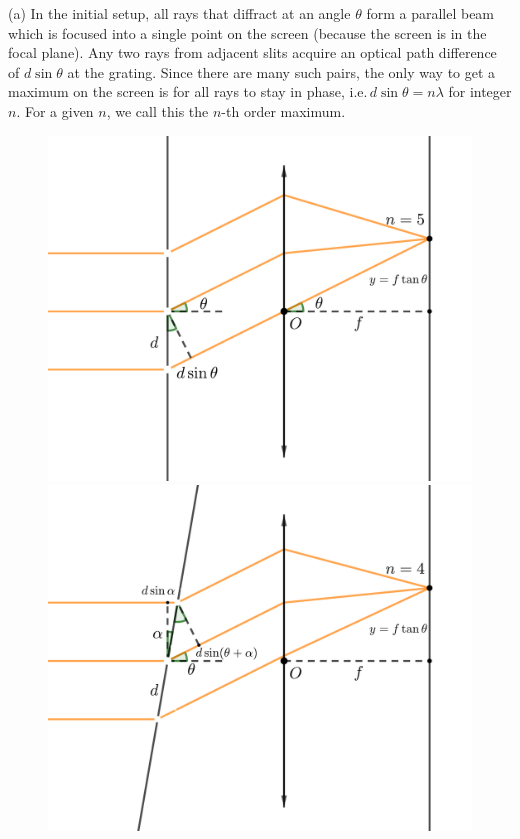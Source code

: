 \documentclass[../TST.tex]{subfiles}
\begin{document}
\ifprob \else
	\begin{solution} (a) In the initial setup, all rays that diffract at an angle $\theta$ form a parallel beam which is focused into a single point on the screen (because the screen is in the focal plane). Any two rays from adjacent slits acquire an optical path difference of $d\sin{\theta}$ at the grating. Since there are many such pairs, the only way to get a maximum on the screen is for all rays to stay in phase, i.e.\,$d\sin{\theta}=n\lambda$ for integer $n$. For a given $n$, we call this the $n$-th order maximum.
\begin{figure}[H]
	\begin{minipage}[b]{0.5\textwidth}
    \centering
\includegraphics[width=\textwidth]{fig/a2011_s61.pdf}
	\end{minipage}\hfill
	\begin{minipage}[b]{0.5\textwidth}
		\centering
\includegraphics[width=\textwidth]{fig/a2011_s62.pdf}

\end{minipage}
\end{figure}
\end{solution}
\end{document}
